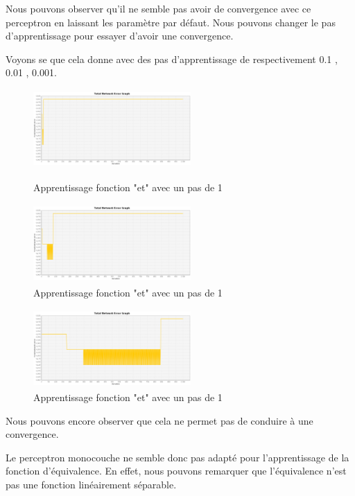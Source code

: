 \documentclass[twoside,openright,a4paper,11pt,french]{article}
\begin{document}
Nous pouvons observer qu'il ne semble pas avoir de convergence avec ce perceptron
en laissant les paramètre par défaut.
Nous pouvons changer le pas d'apprentissage pour essayer d'avoir
une convergence.

Voyons se que cela donne avec des pas d'apprentissage de respectivement 0.1 , 0.01 , 0.001.

\begin{figure}[h]
\caption{Apprentissage fonction "et" avec un pas de 1}
\includegraphics[width=6cm,height=3cm]{./pics/eq/mono_eq_0.1.eps}
\label{fig:anderr4}
\end{figure}

\begin{figure}[h]
\includegraphics[width=6cm,height=3cm]{./pics/eq/mono_eq_0.01.eps}
\caption{Apprentissage fonction "et" avec un pas de 1}
\label{fig:anderr4}
\end{figure}

\begin{figure}[h]
\includegraphics[width=6cm,height=3cm]{./pics/eq/mono_eq_0.001.eps}
\caption{Apprentissage fonction "et" avec un pas de 1}
\label{fig:anderr4}
\end{figure}

Nous pouvons encore observer que cela ne permet pas de conduire à une convergence.

Le perceptron monocouche ne semble donc pas adapté pour l'apprentissage de la fonction
d'équivalence. En effet, nous pouvons remarquer que l'équivalence n'est pas une fonction
linéairement séparable.
\end{document}
